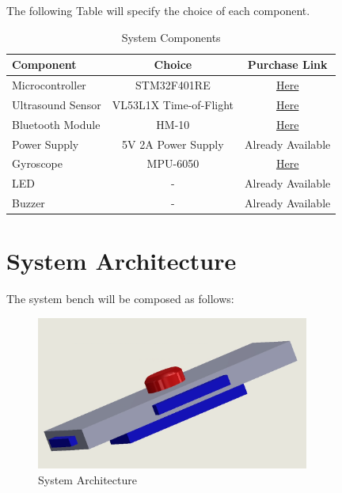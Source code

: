 \documentclass[12pt]{article}
\numberwithin{equation}{section}
\begin{document}
The following Table will specify the choice of each component.
\begin{table}
  \centering
  \caption{System Components}
  \label{tab:system_components}
  \begin{tabular}{lcc}
    \toprule
    \textbf{Component} & \textbf{Choice} & \textbf{Purchase Link} \\
    \midrule
    Microcontroller & STM32F401RE & \href{https://www.amazon.com/gp/product/B06WGZB2N4/ref=ox_sc_act_title_1?smid=AFLYC5O31PGVX&psc=1}{Here}  \\
    Ultrasound Sensor & VL53L1X Time-of-Flight & \href{https://www.amazon.com/gp/product/B01EV70C78/ref=ox_sc_act_title_3?smid=A2WWHQ25ENKVJ1&psc=1}{Here}  \\
    Bluetooth Module & HM-10 & \href{https://www.amazon.com/gp/product/B06WGZB2N4/ref=ox_sc_act_title_1?smid=AFLYC5O31PGVX&psc=1}{Here}  \\
    Power Supply & 5V 2A Power Supply & Already Available \\
    Gyroscope & MPU-6050 & \href{https://www.amazon.com/gp/product/B0B793846N/ref=ox_sc_act_title_2?smid=A1YZW40LYQY3L1&psc=1}{Here} \\
    LED & - & Already Available \\
    Buzzer & - & Already Available \\
    \bottomrule
  \end{tabular}
\end{table}
\newpage


\section{System Architecture}
The system bench will be composed as follows:
\begin{figure}[H]
  \centering
  \includegraphics[width=0.8\textwidth]{Figures/Final.png}
  \caption{System Architecture}
  \label{fig:system_architecture}
\end{figure}
\end{document}
